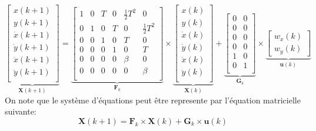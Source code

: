 \documentclass{article}
\begin{document}
\begin{equation}
    \underbrace{\begin{bmatrix}
        x(k+1)\\
        y(k+1)\\
        \dot{x}(k+1)\\
        \dot{y}(k+1)\\
        \ddot{x}(k+1)\\
        \ddot{y}(k+1)\\
    \end{bmatrix}}_{\mathbf{X}(k+1)}
    = 
    \underbrace{\begin{bmatrix}
        1 & 0 & T & 0 & \frac{1}{2}T^2 & 0\\
        0 & 1 & 0 & T & 0              & \frac{1}{2}T^2\\
        0 & 0 & 1 & 0 & T              & 0 \\
        0 & 0 & 0 & 1 & 0              & T \\
        0 & 0 & 0 & 0 & \beta          & 0 \\
        0 & 0 & 0 & 0 & 0              & \beta \\
    \end{bmatrix}}_{\mathbf{F}_{k}}
    \times
    \underbrace{\begin{bmatrix}
        x(k)\\
        y(k)\\
        \dot{x}(k)\\
        \dot{y}(k)\\
        \ddot{x}(k)\\
        \ddot{y}(k)\\
    \end{bmatrix}}_{\mathbf{X}(k)}
    + 
    \underbrace{\begin{bmatrix}
        0 & 0 \\
        0 & 0 \\
        0 & 0 \\
        0 & 0 \\
        1 & 0 \\
        0 & 1 \\
    \end{bmatrix}}_{\mathbf{G}_{k}}
    \times
    \underbrace{\begin{bmatrix}
        w_{x}(k)\\
        w_{y}(k)
    \end{bmatrix}}_{\mathbf{u}(k)}
\end{equation}
On note que le système d'équations peut être represente par l'équation matricielle suivante:
\begin{equation}
    \boxed{\mathbf{X}(k+1) = \mathbf{F}_{k} \times \mathbf{X}(k) + \mathbf{G}_{k} \times \mathbf{u}(k)}
\end{equation}
\end{document}
